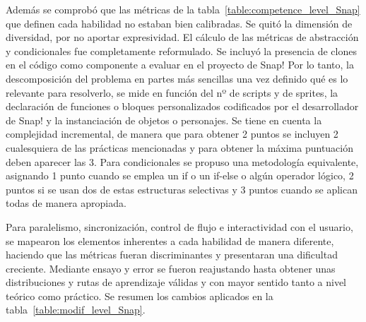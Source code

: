 \documentclass[a4paper, 12pt]{book}
\begin{document}
Además se comprobó que las métricas de la tabla~\ref{table:competence_level_Snap} que definen cada habilidad no estaban bien calibradas. Se quitó la dimensión de diversidad, por no aportar expresividad. El cálculo de las métricas de abstracción y condicionales fue completamente reformulado. Se incluyó la presencia de clones en el código como componente a evaluar en el proyecto de Snap! Por lo tanto, la descomposición del problema en partes más sencillas una vez definido qué es lo relevante para resolverlo, se mide en función del nº de scripts y de sprites, la declaración de funciones o bloques personalizados codificados por el desarrollador de Snap! y la instanciación de objetos o personajes. Se tiene en cuenta la complejidad incremental, de manera que para obtener 2 puntos se incluyen 2 cualesquiera de las prácticas mencionadas y para obtener la máxima puntuación deben aparecer las 3. Para condicionales se propuso una metodología equivalente, asignando 1 punto cuando se emplea un if o un if-else o algún operador lógico, 2 puntos si se usan dos de estas estructuras selectivas y 3 puntos cuando se aplican todas de manera apropiada.

Para paralelismo, sincronización, control de flujo e interactividad con el usuario, se mapearon los elementos inherentes a cada habilidad de manera diferente, haciendo que las métricas fueran discriminantes y presentaran una dificultad creciente. Mediante ensayo y error se fueron reajustando hasta obtener unas distribuciones y rutas de aprendizaje válidas y con mayor sentido tanto a nivel teórico como práctico. Se resumen los cambios aplicados en la tabla~\ref{table:modif_level_Snap}.
\end{document}
